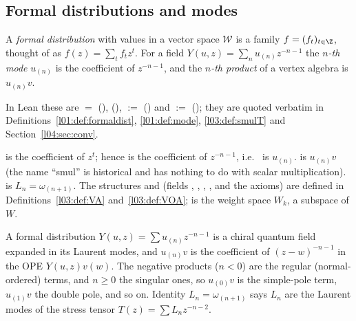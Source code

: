 \subsection{Formal distributions and modes}

\begin{definition}\label{ch04:def:mode}
A \emph{formal distribution} with values in a vector space $\mathcal W$ is a family
$f=(f_t)_{t\in\Z}$, thought of as $f(z)=\sum_t f_t z^t$. For a field
$Y(u,z)=\sum_n u_{(n)}z^{-n-1}$ the \emph{$n$-th mode} $u_{(n)}$ is the coefficient of
$z^{-n-1}$, and the \emph{$n$-th product} of a vertex algebra is $u_{(n)}v$.
\end{definition}

In Lean these are  $=$  (),
 (),
 $:=$  () and
 $:=$ 
(); they are quoted verbatim in
Definitions~\ref{l01:def:formaldist}, \ref{l01:def:mode}, \ref{l03:def:smulT} and
Section~\ref{l04:sec:conv}.

\begin{dictionary}
 is the coefficient of $z^t$; hence  is the coefficient of
$z^{-n-1}$, i.e.\  is $u_{(n)}$.  is $u_{(n)}v$ (the name
``smul'' is historical and has nothing to do with scalar multiplication).  is
$L_n=\omega_{(n+1)}$. The structures  and 
(fields , , , ,  and
the axioms) are defined in Definitions~\ref{l03:def:VA} and~\ref{l03:def:VOA};  is the weight space $W_k$, a
subspace of $W$.
\end{dictionary}

\begin{physics}
A formal distribution $Y(u,z)=\sum u_{(n)}z^{-n-1}$ is a chiral quantum field expanded in its Laurent modes, and $u_{(n)}v$ is the coefficient of $(z-w)^{-n-1}$ in the OPE $Y(u,z)v(w)$. The negative products ($n<0$) are the regular (normal-ordered) terms, and $n\ge0$ the singular ones, so $u_{(0)}v$ is the simple-pole term, $u_{(1)}v$ the double pole, and so on. Identity $L_n=\omega_{(n+1)}$ says $L_n$ are the Laurent modes of the stress tensor $T(z)=\sum L_nz^{-n-2}$.
\end{physics}

